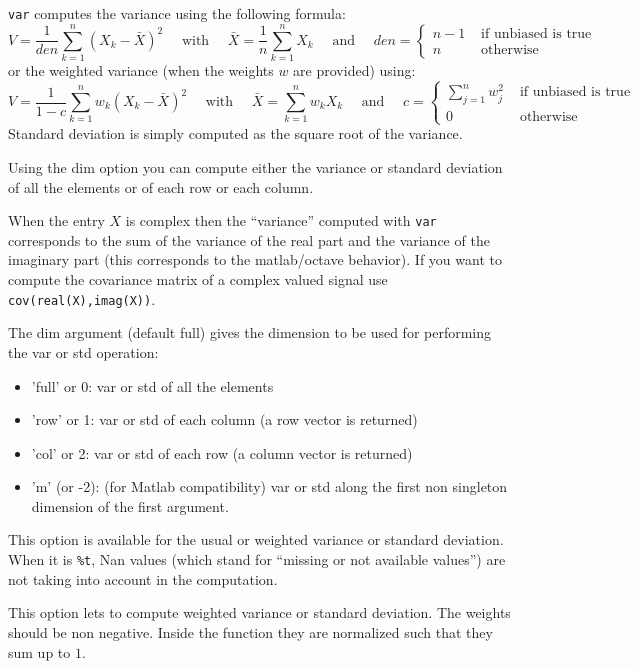 \begin{mandescription}
  \verb+var+ computes the variance using the following formula:
$$
    V = \frac{1}{den} \sum_{k=1}^n (X_k - \bar{X})^2 \quad \mbox{  with  } \quad \bar{X} = \frac{1}{n} \sum_{k=1}^n X_k
   \quad \mbox{ and } \quad  den = \left\{ \begin{array}{cl}  n-1 & \mbox{ if unbiased is true}\\
                                                       n   & \mbox{ otherwise} \end{array}\right.
$$
or the weighted variance (when the weights $w$ are provided) using:
$$
    V = \frac{1}{1 - c} \sum_{k=1}^n w_k (X_k - \bar{X})^2 \quad \mbox{  with  } \quad \bar{X} =  \sum_{k=1}^n  w_k X_k
   \quad \mbox{ and } \quad  c = \left\{ \begin{array}{cl} \sum_{j=1}^n w_j^2  & \mbox{ if unbiased is true}\\
                                                       0   & \mbox{ otherwise} \end{array}\right.
$$
Standard deviation is simply computed as the square root of the variance.

Using the dim option you can compute either the variance or standard deviation
of all the elements or of each row or each column. 

When the entry $X$ is complex then the ``variance'' computed with \verb+var+ corresponds 
to the sum of the variance of the real part and the variance of the imaginary part (this 
corresponds to the matlab/octave behavior). If you want to compute the covariance matrix 
of a complex valued signal use \verb+cov(real(X),imag(X))+.

  The dim argument (default full) gives the dimension to be used for performing the var or std operation:
  \begin{itemize}
    \item 'full' or 0: var or std of all the elements 
    \item 'row' or 1: var or std of each column (a row vector is returned)
    \item 'col' or 2: var or std of each row (a column vector is returned)
    \item 'm' (or -2): (for Matlab compatibility) var or std along the first non 
          singleton dimension of the first argument.
  \end{itemize}

   This option is available for the usual or weighted variance or standard deviation. 
When it is \verb+%t+,  Nan values (which stand for ``missing or not available values'') 
are not taking into account in the computation.
   
  This option lets to compute weighted variance or standard deviation. The weights should be non negative. Inside
the function they are normalized such that they sum up to $1$.
   
\end{mandescription}

